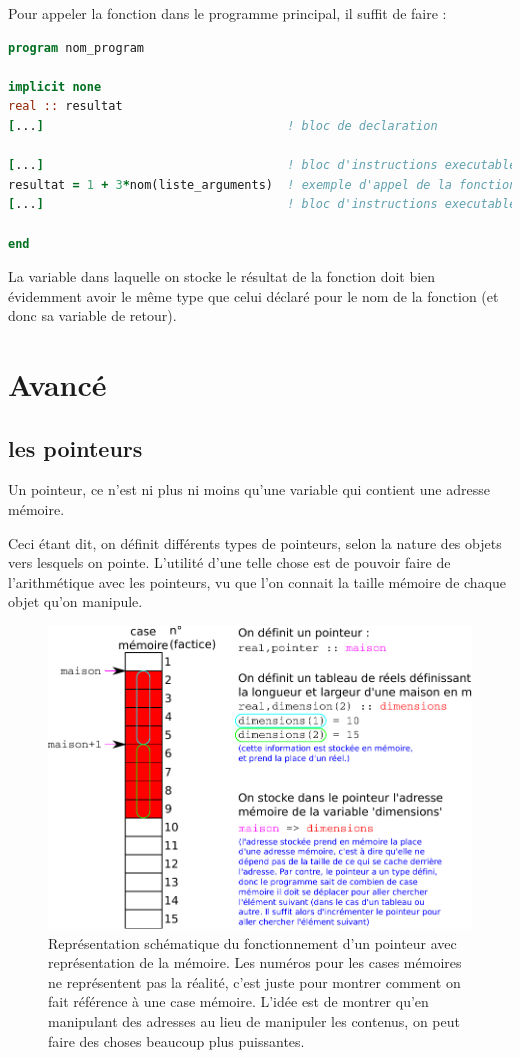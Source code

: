 \documentclass[a4paper,twoside]{article}
\begin{document}
Pour appeler la fonction dans le programme principal, il suffit de faire :
\begin{lstlisting}[language=Fortran]
program nom_program 

implicit none 
real :: resultat
[...]                                  ! bloc de declaration 

[...]                                  ! bloc d'instructions executables 
resultat = 1 + 3*nom(liste_arguments)  ! exemple d'appel de la fonction nom 
[...]                                  ! bloc d'instructions executables 

end 
\end{lstlisting}

\begin{remarque}
La variable dans laquelle on stocke le résultat de la fonction doit bien évidemment avoir le même type que celui déclaré pour le nom de la fonction (et donc sa variable de retour).
\end{remarque}


\section{Avancé}
\subsection{les pointeurs}
Un pointeur, ce n'est ni plus ni moins qu'une variable qui contient une adresse mémoire. 

Ceci étant dit, on définit différents types de pointeurs, selon la nature des objets vers lesquels on pointe. L'utilité d'une telle chose est de pouvoir faire de l'arithmétique avec les pointeurs, vu que l'on connait la taille mémoire de chaque objet qu'on manipule. 

\begin{figure}[htb]
\centering
\includegraphics[width=0.65\linewidth]{figure/pointeurs.pdf}
\caption{Représentation schématique du fonctionnement d'un pointeur avec représentation de la mémoire. Les numéros pour les cases mémoires ne représentent pas la réalité, c'est juste pour montrer comment on fait référence à une case mémoire. L'idée est de montrer qu'en manipulant des adresses au lieu de manipuler les contenus, on peut faire des choses beaucoup plus puissantes.}
\end{figure}

\end{document}
